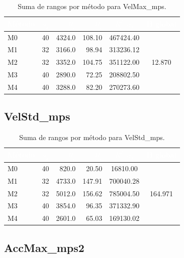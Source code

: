 \documentclass[12pt,a4paper,oneside]{book}
\begin{document}
\begin{table}[H]
\centering
\small
\caption{Suma de rangos por método para VelMax\_mps.}
\begin{tabular}{lcrrcc}
\toprule
\rowcolor{primary}
\textcolor{white}{\textbf{Método}} & \textcolor{white}{$n_j$} & \textcolor{white}{$R_j$} & \textcolor{white}{$\bar{R}_j$} & \textcolor{white}{$R_j^2/n_j$} & \textcolor{white}{H global} \\
\midrule
M0 & 40 & 4324.0 & 108.10 & 467424.40 & \multirow{5}{*}{12.870} \\
M1 & 32 & 3166.0 & 98.94 & 313236.12 & \\
M2 & 32 & 3352.0 & 104.75 & 351122.00 & \\
M3 & 40 & 2890.0 & 72.25 & 208802.50 & \\
M4 & 40 & 3288.0 & 82.20 & 270273.60 & \\
\bottomrule
\end{tabular}
\end{table}

\subsection{VelStd\_mps}

\begin{table}[H]
\centering
\small
\caption{Suma de rangos por método para VelStd\_mps.}
\begin{tabular}{lcrrcc}
\toprule
\rowcolor{primary}
\textcolor{white}{\textbf{Método}} & \textcolor{white}{$n_j$} & \textcolor{white}{$R_j$} & \textcolor{white}{$\bar{R}_j$} & \textcolor{white}{$R_j^2/n_j$} & \textcolor{white}{H global} \\
\midrule
M0 & 40 & 820.0 & 20.50 & 16810.00 & \multirow{5}{*}{164.971} \\
M1 & 32 & 4733.0 & 147.91 & 700040.28 & \\
M2 & 32 & 5012.0 & 156.62 & 785004.50 & \\
M3 & 40 & 3854.0 & 96.35 & 371332.90 & \\
M4 & 40 & 2601.0 & 65.03 & 169130.02 & \\
\bottomrule
\end{tabular}
\end{table}

\subsection{AccMax\_mps2}
\end{document}
